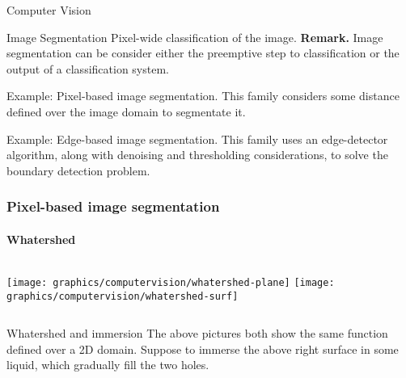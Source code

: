     \begin{frame}{Computer Vision}
        \begin{description}
            \item<1->   \begin{block}{Image Segmentation}
                            Pixel-wide classification of the image. \textbf{Remark.} Image segmentation can be consider either the preemptive step to classification or the output of a classification system.
                        \end{block}
            \item<2->   \vskip -0.5cm 
                        \begin{exampleblock}{Example: Pixel-based image segmentation.}
                            This family considers some distance defined over the image domain to segmentate it.
                        \end{exampleblock}
            \item<3->   \vskip -0.5cm 
                        \begin{exampleblock}{Example: Edge-based image segmentation.}
                            This family uses an edge-detector algorithm, along with denoising and thresholding considerations, to solve the boundary detection problem.
                        \end{exampleblock}
        \end{description}
    \end{frame}

    \begin{frame}
        \frametitle{Pixel-based image segmentation}
        \framesubtitle{Whatershed}
        \begin{columns}[onlytextwidth]
            \texttt{[image: graphics/computervision/whatershed-plane]}
            \texttt{[image: graphics/computervision/whatershed-surf]}
        \end{columns}
        \begin{block}{Whatershed and immersion}
            The above pictures both show the same function defined over a 2D domain. Suppose to immerse the above right surface in some liquid, which gradually fill the two holes.
        \end{block}
    \end{frame}

